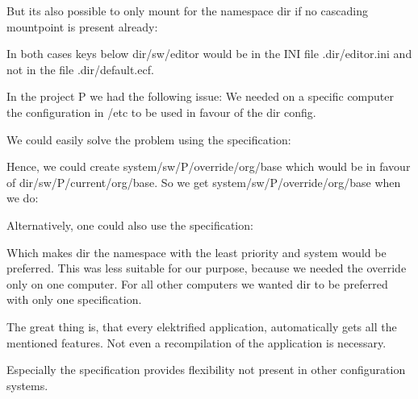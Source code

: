 But its also possible to only mount for the namespace dir if no cascading mountpoint is present already\+:


\begin{DoxyCode}{0}
\end{DoxyCode}


In both cases keys below dir/sw/editor would be in the I\+NI file {\ttfamily .dir/editor.\+ini} and not in the file {\ttfamily .dir/default.\+ecf}.

In the project P we had the following issue\+: We needed on a specific computer the configuration in /etc to be used in favour of the dir config.

We could easily solve the problem using the specification\+:


\begin{DoxyCode}{0}
\end{DoxyCode}


Hence, we could create system/sw/\+P/override/org/base which would be in favour of dir/sw/\+P/current/org/base. So we get system/sw/\+P/override/org/base when we do\+:


\begin{DoxyCode}{0}
\end{DoxyCode}


Alternatively, one could also use the specification\+:


\begin{DoxyCode}{0}
\end{DoxyCode}


Which makes dir the namespace with the least priority and system would be preferred. This was less suitable for our purpose, because we needed the override only on one computer. For all other computers we wanted dir to be preferred with only one specification.

The great thing is, that every elektrified application, automatically gets all the mentioned features. Not even a recompilation of the application is necessary.

Especially the specification provides flexibility not present in other configuration systems.

